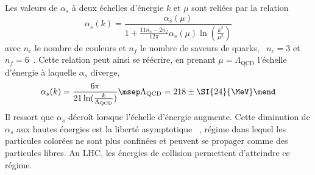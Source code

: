 \par Les valeurs de $\alpha_s$ à deux échelles d'énergie $k$ et $\mu$ sont reliées par la relation
\begin{equation}
\alpha_s(k) = \frac{\alpha_s(\mu)}{1+ \frac{11n_c-2n_f}{12\pi} \alpha_s(\mu)\ln(\frac{k^2}{\mu^2})}
\end{equation}
avec $n_c$ le nombre de couleurs et $n_f$ le nombre de saveurs de quarks, \ie\ $n_c=3$ et $n_f=6$~\cite{salam2010elements}.
Cette relation peut ainsi se réécrire, en prenant $\mu=\Lambda_\text{QCD}$ l'échelle d'énergie à laquelle $\alpha_s$ diverge,
\begin{equation}
\alpha_s (k) =
\frac{6\pi}{21 \ln(\frac{k}{\Lambda_\text{QCD}})}
\msep
\Lambda_\text{QCD} = 218\pm\SI{24}{\MeV}
\mend
\end{equation}
Il ressort que $\alpha_s$ décroît lorsque l'échelle d'énergie augmente.
Cette diminution de $\alpha_s$ aux hautes énergies est la \og liberté asymptotique \fg~\cite{QCD_asymptotic_freedom_1,QCD_asymptotic_freedom_2}, régime dans lequel les particules colorées ne sont plus confinées et peuvent se propager comme des particules libres. Au LHC, les énergies de collision permettent d'atteindre ce régime.
